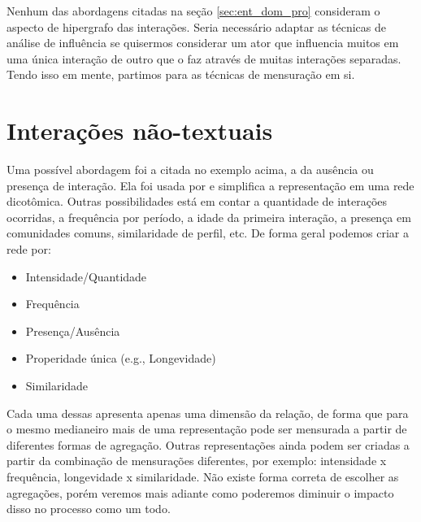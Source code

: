 \documentclass{article}
\begin{document}
Nenhum das abordagens citadas na seção \ref{sec:ent_dom_pro} consideram o
aspecto de hipergrafo das interações. Seria necessário adaptar as técnicas de
análise de influência se quisermos considerar um ator que influencia muitos em
uma única interação de outro que o faz através de muitas interações separadas.
Tendo isso em mente, partimos para as técnicas de mensuração em si.

\section{Interações não-textuais}

Uma possível abordagem foi a citada no exemplo acima, a da ausência ou presença
de interação. Ela foi usada por \cite{Xiang2010} e simplifica a representação em
uma rede dicotômica. Outras possibilidades está em contar a quantidade de
interações ocorridas, a frequência por período, a idade da primeira interação, a
presença em comunidades comuns, similaridade de perfil, etc. De forma geral
podemos criar a rede por:

\begin{itemize}
\item Intensidade/Quantidade
\item Frequência
\item Presença/Ausência
\item Properidade única (e.g., Longevidade)
\item Similaridade
\end{itemize}

Cada uma dessas apresenta apenas uma dimensão da relação, de forma que para o
mesmo medianeiro mais de uma representação pode ser mensurada a partir de
diferentes formas de agregação. Outras representações ainda podem ser criadas a
partir da combinação de mensurações diferentes, por exemplo: intensidade x
frequência, longevidade x similaridade. Não existe forma correta de escolher as
agregações, porém veremos mais adiante como poderemos diminuir o impacto disso
no processo como um todo. 
\end{document}
